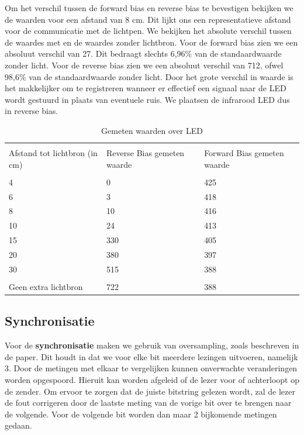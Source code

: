 \documentclass{article}
\begin{document}
Om het verschil tussen de forward bias en reverse bias te bevestigen bekijken we de waarden voor een afstand van 8 cm. Dit lijkt ons een representatieve afstand voor de communicatie met de lichtpen. We bekijken het absolute verschil tussen de waardes met en de waardes zonder lichtbron. 
Voor de forward bias zien we een absoluut verschil van 27. Dit bedraagt slechts 6,96\% van de standaardwaarde zonder licht. 
Voor de reverse bias zien we een absoluut verschil van 712, ofwel 98,6\% van de standaardwaarde zonder licht. 
Door het grote verschil in waarde is het makkelijker om te registreren wanneer er effectief een signaal naar de LED wordt gestuurd in plaats van eventuele ruis. We plaatsen de infrarood LED dus in reverse bias.


\begin{table}
	\centering
    \begin{tabular}{ | p{1.5cm} | p{1.5 cm} | p{1.5 cm} | }
    \hline
    & & \\
    Afstand tot lichtbron (in cm) & Reverse Bias gemeten waarde & Forward Bias gemeten waarde  \\ \hline
    & &  \\
    4 & 0 & 425  \\ 
    6 & 3 & 418   \\ 
    8 & 10 & 416   \\ 
    10 & 24 & 413   \\ 
    15 & 330 & 405   \\ 
    20 & 380 & 397  \\ 
    30 & 515 & 388  \\ \hline
    & & \\ 
    Geen extra lichtbron & 722 & 388   \\ 

    \hline
    \end{tabular}
  \caption{Gemeten waarden over LED} 
\end{table}

\subsection{Synchronisatie}\label{synch}

 Voor de \textbf{synchronisatie} maken we gebruik van oversampling, zoals beschreven in de paper. Dit houdt in dat we voor elke bit meerdere lezingen uitvoeren, namelijk 3. Door de metingen met elkaar te vergelijken kunnen onverwachte veranderingen worden opgespoord. Hieruit kan worden afgeleid of de lezer voor of achterloopt op de zender. Om ervoor te zorgen dat de juiste bitstring gelezen wordt, zal de lezer de fout corrigeren door de laatste meting van de vorige bit over te brengen naar de volgende. Voor de volgende bit worden dan maar 2 bijkomende metingen gedaan.
 
\end{document}
